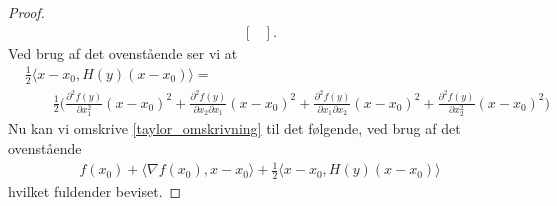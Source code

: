 \begin{proof}
\begin{align*}
\begin{bmatrix}
    \end{bmatrix}.
  \end{align*}
  Ved brug af det ovenstående ser vi at
  \begin{align*}
    &\frac{1}{2} \langle x - x_0, H(y)(x - x_0) \rangle =\\
    &\qquad \frac{1}{2}
    \bigg( \frac{\partial^2 f(y)}{\partial x_1^2}(x- x_0)^2 +
    \frac{\partial^2 f(y)}{\partial x_2 \partial x_1}(x- x_0)^2 +
    \frac{\partial^2 f(y)}{\partial x_1 \partial x_2}(x- x_0)^2 +
    \frac{\partial^2 f(y)}{\partial x_2^2}(x- x_0)^2 \bigg)
  \end{align*}
  Nu kan vi omskrive \eqref{taylor_omskrivning} til det følgende, ved brug af det ovenstående
  \begin{align*}
    f(x_0) + \langle \nabla f(x_0), x - x_0 \rangle + \frac{1}{2}\langle x - x_0, H(y)(x - x_0)\rangle
  \end{align*}
  hvilket fuldender beviset.
\end{proof}

